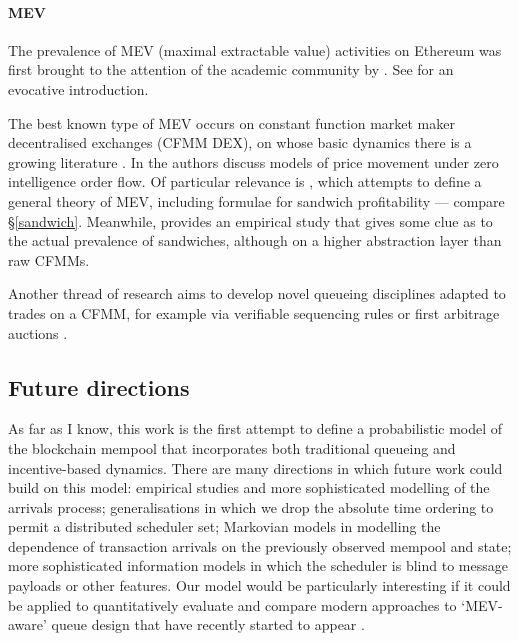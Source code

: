 \documentclass[a4paper,11pt]{article}
\begin{document}
\paragraph{MEV} The prevalence of MEV (maximal extractable value) activities on Ethereum was first brought to the attention of the academic community by \cite{daian2020flash}. See \cite{robinson2020ethereum} for an evocative introduction. 

The best known type of MEV occurs on constant function market maker decentralised exchanges (CFMM DEX), on whose basic dynamics there is a growing literature \cite{angeris2020improved, angeris2022constant, xu2022sok}.
%
In \cite{goyal2022finding} the authors discuss models of price movement under zero intelligence order flow.
%
Of particular relevance is \cite{kulkarni2022towards}, which attempts to define a general theory of MEV, including formulae for sandwich profitability --- compare \S\ref{sandwich}.
%
Meanwhile, \cite{0xblog2022measuring} provides an empirical study that gives some clue as to the actual prevalence of sandwiches, although on a higher abstraction layer than raw CFMMs.

Another thread of research aims to develop novel queueing disciplines adapted to trades on a CFMM, for example via verifiable sequencing rules \cite{ferreira2022credible} or first arbitrage auctions \cite{josojo2022mev,nikete2022towards}.

\subsection{Future directions}
As far as I know, this work is the first attempt to define a probabilistic model of the blockchain mempool that incorporates both traditional queueing and incentive-based dynamics.
%
There are many directions in which future work could build on this model: empirical studies and more sophisticated modelling of the arrivals process; generalisations in which we drop the absolute time ordering to permit a distributed scheduler set; Markovian models in modelling the dependence of transaction arrivals on the previously observed mempool and state; more sophisticated information models in which the scheduler is blind to message payloads or other features.
%
Our model would be particularly interesting if it could be applied to quantitatively evaluate and compare modern approaches to `MEV-aware' queue design that have recently started to appear \cite{ferreira2022credible,josojo2022mev,nikete2022towards}.
\end{document}
